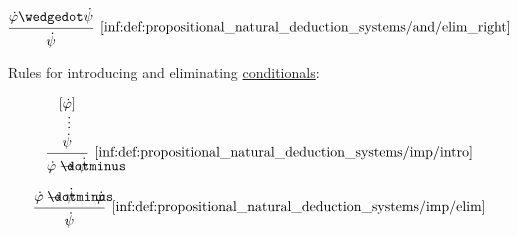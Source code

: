 \begin{definition}
\begin{thmenum}
\begin{paracol}{3}
      \begin{nthcolumn}{2}
        \leavevmode\vfill
        \begin{equation*}\taglabel[\ensuremath{ \wedge^{-_R} }]{inf:def:propositional_natural_deduction_systems/and/elim_right}
          \begin{prooftree}
            \hypo{ \syn\varphi \synwedge \syn\psi }
            \infer1[\ref{inf:def:propositional_natural_deduction_systems/and/elim_right}]{ \syn\psi }
          \end{prooftree}
        \end{equation*}
      \end{nthcolumn}
    \end{paracol}

     Rules for introducing and eliminating \hyperref[def:propositional_alphabet/connectives/conditional]{conditionals}:
    \begin{paracol}{2}
      \begin{leftcolumn}
        \leavevmode\vfill
        \begin{equation*}\taglabel[\ensuremath{ \rightarrow^+ }]{inf:def:propositional_natural_deduction_systems/imp/intro}
          \begin{prooftree}[center=false]
            \hypo{ [\syn\varphi] }
            \ellipsis {} { \syn\psi }
            \infer1[\ref{inf:def:propositional_natural_deduction_systems/imp/intro}]{ \syn\varphi \synimplies \syn\psi }
          \end{prooftree}
        \end{equation*}
      \end{leftcolumn}

      \begin{rightcolumn}
        \leavevmode\vfill
        \begin{equation*}\taglabel[\ensuremath{ \rightarrow^- }]{inf:def:propositional_natural_deduction_systems/imp/elim}
          \begin{prooftree}[center=false]
            \hypo{ \syn\varphi \synimplies \syn\psi }
            \hypo{ \syn\varphi }
            \infer2[\ref{inf:def:propositional_natural_deduction_systems/imp/elim}]{ \syn\psi }
          \end{prooftree}
        \end{equation*}
      \end{rightcolumn}
    \end{paracol}


\end{thmenum}
\end{definition}
